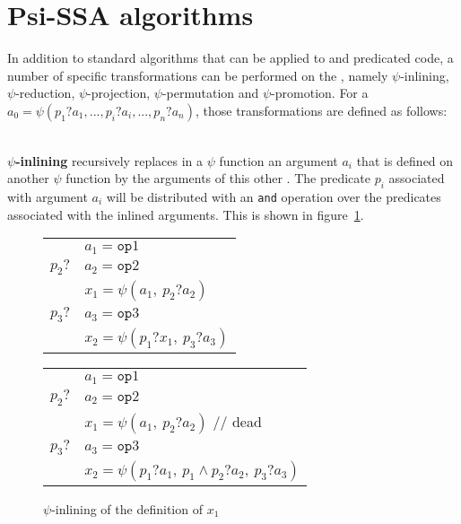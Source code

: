 \section{Psi-SSA algorithms}



In addition to standard algorithms that can be applied to \psifuns and predicated code, a number of specific transformations
can be performed on the \psifuns, namely $\psi$-inlining,
$\psi$-reduction, $\psi$-projection, $\psi$-permutation and
$\psi$-promotion. For a \psifun ${a_0 = \psi(p_1?a_1, ...,
  p_i?a_i, ..., p_n?a_n)}$, those transformations are defined as
follows:

~\\
{\bf $\psi$-inlining} recursively replaces in a $\psi$
  function an argument ${a_i}$ that is defined on another $\psi$
  function by the arguments of this other \psifun. The
  predicate ${p_i}$ associated with argument ${a_i}$ will be distributed
  with an \texttt{and} operation over the predicates associated with the
  inlined arguments. This is shown in figure~\ref{fig:psi_inlining}.
\begin{figure}[h]
\begin{center}
\footnotesize\hfill
{
\begin{tabular}{ll}
             & ${a_1 = \texttt{op}1}$  \\
${p_2?}$ & ${a_2 = \texttt{op}2}$        \\
             & ${x_1 = \psi(a_1,\ p_2?a_2)}$\\
${p_3?}$ & ${a_3 = \texttt{op}3}$             \\
             & ${x_2 = \psi(p_1?x_1,\ p_3?a_3)}$ \\
\end{tabular}
} \hfill
{
\begin{tabular}{ll}
                & ${a_1 = \texttt{op}1}$ \\
 ${p_2?}$ & ${a_2 = \texttt{op}2}$ \\
           & \color{gray} $x_1 = \psi(a_1,\ p_2?a_2)$ // dead \\
 ${p_3?}$ & ${a_3 = \texttt{op}3}$ \\
         & ${x_2 = \psi(p_1?a_1,\ p_1\wedge p_2?a_2,\ p_3?a_3)}$ \\
\end{tabular}
}
\caption{$\psi$-inlining of the definition of $x_1$}
\label{fig:psi_inlining}
\end{center}
\end{figure}

